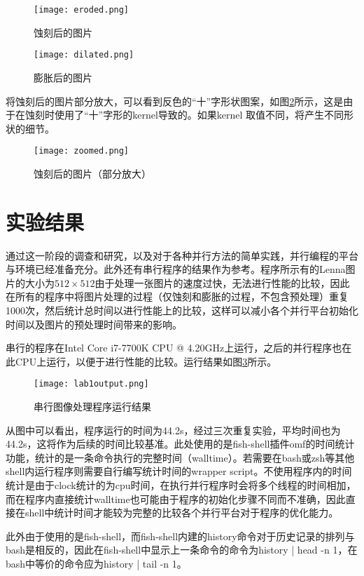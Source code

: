 \begin{figure}[htpb]
    \centering
    \begin{minipage}{0.45\linewidth}
        \centering
        \texttt{[image: eroded.png]}
        \caption{蚀刻后的图片}
        \label{fig:eroded}
    \end{minipage}
    \hfill
    \begin{minipage}{0.45\linewidth}
        \centering
        \texttt{[image: dilated.png]}
        \caption{膨胀后的图片}
        \label{fig:dilated}
    \end{minipage}
\end{figure}

\par 将蚀刻后的图片部分放大，可以看到反色的``十''字形状图案，如图\ref{fig:zoomed}所示，这是由于在蚀刻时使用了``十''字形的kernel导致的。如果kernel 取值不同，将产生不同形状的细节。
\begin{figure}[htpb]
    \centering
    \texttt{[image: zoomed.png]}
    \caption{蚀刻后的图片（部分放大）}
    \label{fig:zoomed}
\end{figure}

\section{实验结果}
\par 通过这一阶段的调查和研究，以及对于各种并行方法的简单实践，并行编程的平台与环境已经准备充分。此外还有串行程序的结果作为参考。程序所示有的Lenna图片的大小为\(512\times 512\)由于处理一张图片的速度过快，无法进行性能的比较，因此在所有的程序中将图片处理的过程（仅蚀刻和膨胀的过程，不包含预处理）重复1000次，然后统计总时间以进行性能上的比较，这样可以减小各个并行平台初始化时间以及图片的预处理时间带来的影响。
\par 串行的程序在Intel\textsuperscript{\textregistered} Core\textsuperscript{\texttrademark} i7-7700K CPU @ 4.20GHz上运行，之后的并行程序也在此CPU上运行，以便于进行性能的比较。运行结果如图\ref{fig:lab1output}所示。

\begin{figure}[htpb]
    \centering
    \texttt{[image: lab1output.png]}
    \caption{串行图像处理程序运行结果}
    \label{fig:lab1output}
\end{figure}

\par 从图中可以看出，程序运行的时间为44.2s，经过三次重复实验，平均时间也为44.2s，这将作为后续的时间比较基准。此处使用的是fish-shell插件omf的时间统计功能，统计的是一条命令执行的完整时间（walltime）。若需要在bash或zsh等其他shell内运行程序则需要自行编写统计时间的wrapper script。不使用程序内的时间统计是由于clock统计的为cpu时间，在执行并行程序时会将多个线程的时间相加，而在程序内直接统计walltime也可能由于程序的初始化步骤不同而不准确，因此直接在shell中统计时间才能较为完整的比较各个并行平台对于程序的优化能力。
\par 此外由于使用的是fish-shell，而fish-shell内建的history命令对于历史记录的排列与bash是相反的，因此在fish-shell中显示上一条命令的命令为history | head -n 1，在bash中等价的命令应为history | tail -n 1。


